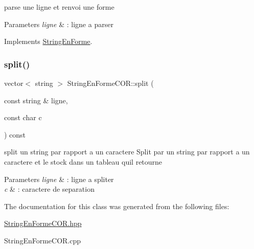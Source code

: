 parse une ligne et renvoi une forme 


\begin{DoxyParams}{Parameters}
{\em ligne} & \+: ligne a parser \\
\hline
\end{DoxyParams}


Implements \mbox{\hyperlink{class_string_en_forme_a9bc80e648471ed76fec821b8895d41d9}{String\+En\+Forme}}.

\mbox{\label{class_string_en_forme_c_o_r_aa184a9544ad408ee03ccb0cae5b742e4}} 
\subsubsection{\texorpdfstring{split()}{split()}}
{\footnotesize\ttfamily vector$<$ string $>$ String\+En\+Forme\+C\+O\+R\+::split (\begin{DoxyParamCaption}\item[{const string \&}]{ligne,  }\item[{const char}]{c }\end{DoxyParamCaption}) const}



split un string par rapport a un caractere Split par un string par rapport a un caractere et le stock dans un tableau qu\textquotesingle{}il retourne 


\begin{DoxyParams}{Parameters}
{\em ligne} & \+: ligne a spliter \\
\hline
{\em c} & \+: caractere de separation \\
\hline
\end{DoxyParams}


The documentation for this class was generated from the following files\+:\begin{DoxyCompactItemize}
\item 
\mbox{\hyperlink{_string_en_forme_c_o_r_8hpp}{String\+En\+Forme\+C\+O\+R.\+hpp}}\item 
String\+En\+Forme\+C\+O\+R.\+cpp\end{DoxyCompactItemize}
